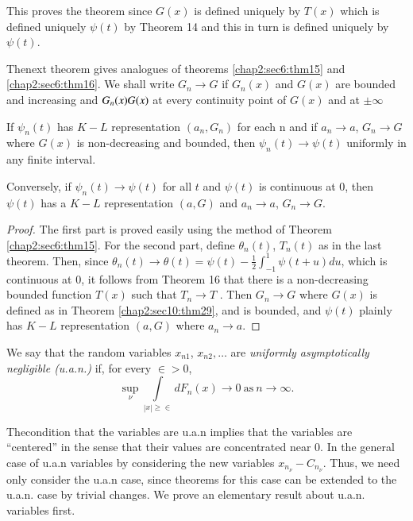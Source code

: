 	This proves the theorem since $G(x)$ is defined uniquely by $T(x)$
        which is defined uniquely $\psi (t)$ by Theorem 14 and this in
        turn is defined uniquely by $\psi(t)$.
	
	The\pageoriginale next theorem gives analogues of theorems
        \ref{chap2:sec6:thm15} and \ref{chap2:sec6:thm16}. We
        shall write $G_n \rightarrow G$ if $G_n(x)$ and $G(x)$ are bounded and
        increasing and $G_n (x)\break G(x)$ at every continuity point of $G(x)$ and
        at $\pm \infty$
	
\begin{theorem}\label{chap2:sec10:thm30} %
  If $\psi_n (t)$ has $K-L$ representation $(a_n, G_n)$ for each n
  and if $a_n \rightarrow a$, $G_n \rightarrow G$ where $G(x)$ is
  non-decreasing and bounded, then $\psi_n(t) \rightarrow
  \psi (t)$ uniformly in any finite interval. 
  
  Conversely, if $\psi_n(t) \rightarrow \psi(t)$ for all $t$ and
  $\psi (t)$ is continuous at 0, then $\psi (t)$ has a $K-L$ representation
  $(a, G)$ and $a_n \rightarrow a$, $G_n \rightarrow G$. 
\end{theorem}

\begin{proof}
  The first part is proved easily using the method of Theorem
  \ref{chap2:sec6:thm15}. For the second part, define $\theta_n (t)$, $T_n (t)$ as in
  the last theorem. Then, since $\theta_n (t)\rightarrow
  \theta(t)= \psi(t)-\frac{1}{2} \int_{-1}^1 \psi (t+u)du$,
  which is continuous at 0, it follows from Theorem 16 that
  there is a non-decreasing bounded function $T(x)$ such that
  $T_n \rightarrow T$ . Then $G_n \rightarrow G$ where $G(x)$ is
  defined as in Theorem \ref{chap2:sec10:thm29}, and is bounded, and $\psi (t)$
  plainly has $K-L$ representation $(a, G)$ where $a_n \rightarrow 
  a$. 
\end{proof}

\begin{defi*} We say that the random
      variables $x_{n1}$, $x_{n2},\ldots$ are \textit{uniformly asymptotically
      negligible (u.a.n.)} if, for every $\in > 0$,   
      $$
      \sup\limits_\nu \int\limits_{|x| \geq \in} d
      F_n(x)\rightarrow 0 ~\text{as}~ n \rightarrow  \infty.
      $$  	 
\end{defi*}

 	The\pageoriginale condition that the variables are u.a.n implies that
        the variables  
 are ``centered'' in the sense that their values are concentrated near 0. 
 In the general case of u.a.n variables by considering the new
 variables  $x_{n_\nu}-C_{n_\nu}$.   
 Thus, we need only consider the u.a.n case, since theorems for this
 case can be   
 extended to the u.a.n. case by trivial changes. We prove an
 elementary result about u.a.n. variables first. 
 
